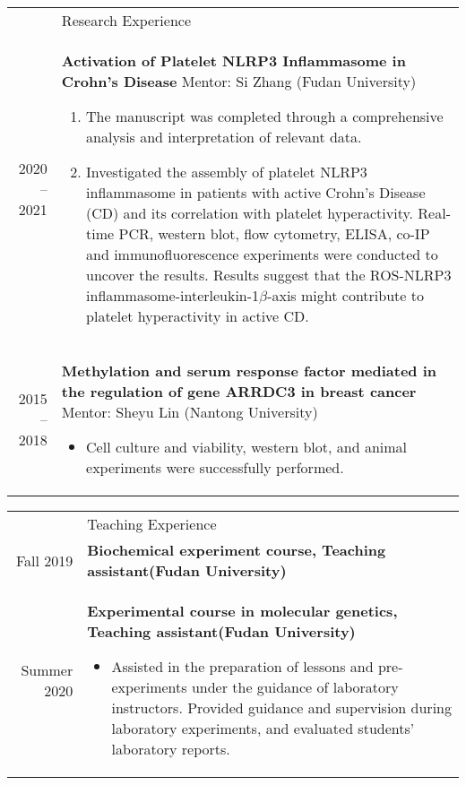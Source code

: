 \documentclass[letterpaper, 11pt]{article}
\newcommand{\headingfont}{\Large\color{LimeGreen}}
\newenvironment{SectionTable}[1]{
	\renewcommand*{\arraystretch}{1.7}
	\setlength{\tabcolsep}{10pt}
	\begin{longtable}{Rp{5.2in}} & #1 \\}
{\end{longtable}\vspace{-.3cm}}
\begin{document}
\begin{SectionTable}{\headingfont Research Experience}
2020 -- 2021 &
\textbf{Activation of Platelet NLRP3 Inflammasome in Crohn's Disease} \newline
Mentor: Si Zhang (Fudan University) 
\begin{enumerate}
	\item The manuscript was completed through a comprehensive analysis and interpretation of relevant data.
	\item Investigated the assembly of platelet NLRP3 inflammasome in patients with active Crohn's Disease (CD) and its correlation with platelet hyperactivity. Real-time PCR, western blot, flow cytometry, ELISA, co-IP and immunofluorescence experiments were conducted to uncover the results. Results suggest that the ROS-NLRP3 inflammasome-interleukin-1$\beta$-axis might contribute to platelet hyperactivity in active CD. 
\end{enumerate}  \\

2015 -- 2018 &
\textbf{Methylation and serum response factor mediated in the regulation of gene ARRDC3 in breast cancer} \newline
Mentor: Sheyu Lin (Nantong University)
\begin{itemize}
	\item Cell culture and viability, western blot, and animal experiments were successfully performed.
\end{itemize}
\end{SectionTable}


\begin{SectionTable}{\headingfont Teaching Experience}
Fall 2019 & 
\textbf{Biochemical experiment course, Teaching assistant(Fudan University)} \\

Summer  2020 & 
\textbf{Experimental course in molecular genetics, Teaching assistant(Fudan University)}
\begin{itemize}
	\item Assisted in the preparation of lessons and pre-experiments under the guidance of laboratory instructors. Provided guidance and supervision during laboratory experiments, and evaluated students' laboratory reports. 
\end{itemize}
\end{SectionTable}

\end{document}

